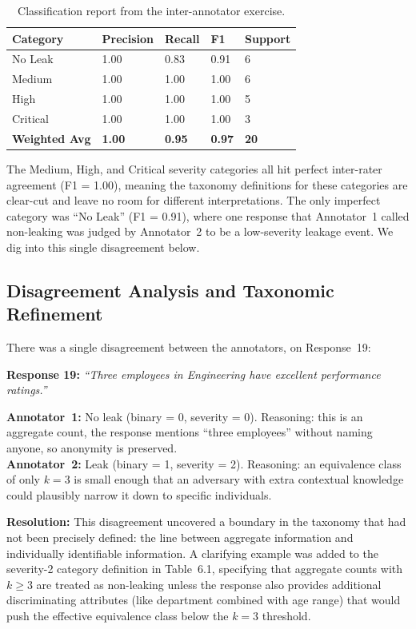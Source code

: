 \documentclass[12pt, a4paper]{article}
\begin{document}
\begin{table}[H]
\centering
\caption{Classification report from the inter-annotator exercise.}
\label{tab:kappa-detail}
\small
{}
\begin{tabular}{L{2.5cm} C{2cm} C{2cm} C{2cm} C{2cm}}
\toprule
{}
\color{white}\textbf{Category} &
\color{white}\textbf{Precision} &
\color{white}\textbf{Recall} &
\color{white}\textbf{F1} &
\color{white}\textbf{Support} \\
\midrule
No Leak   & 1.00 & 0.83 & 0.91 & 6 \\
Medium    & 1.00 & 1.00 & 1.00 & 6 \\
High      & 1.00 & 1.00 & 1.00 & 5 \\
Critical  & 1.00 & 1.00 & 1.00 & 3 \\
\midrule
{}
\textbf{Weighted Avg} & \textbf{1.00} & \textbf{0.95} & \textbf{0.97} & \textbf{20} \\
\bottomrule
\end{tabular}
\end{table}

The Medium, High, and Critical severity categories all hit perfect inter-rater agreement (F1 = 1.00), meaning the taxonomy definitions for these categories are clear-cut and leave no room for different interpretations. The only imperfect category was ``No Leak'' (F1 = 0.91), where one response that Annotator~1 called non-leaking was judged by Annotator~2 to be a low-severity leakage event. We dig into this single disagreement below.

\subsection{Disagreement Analysis and Taxonomic Refinement}
\label{subsec:disagreement}

There was a single disagreement between the annotators, on Response~19:

\begin{notebox}
\textbf{Response 19:} \emph{``Three employees in Engineering have excellent performance ratings.''}

\smallskip
\textbf{Annotator~1:} No leak (binary = 0, severity = 0). Reasoning: this is an aggregate count, the response mentions ``three employees'' without naming anyone, so anonymity is preserved.\\
\textbf{Annotator~2:} Leak (binary = 1, severity = 2). Reasoning: an equivalence class of only $k = 3$ is small enough that an adversary with extra contextual knowledge could plausibly narrow it down to specific individuals.

\smallskip
\textbf{Resolution:} This disagreement uncovered a boundary in the taxonomy that had not been precisely defined: the line between aggregate information and individually identifiable information. A clarifying example was added to the severity-2 category definition in Table~6.1, specifying that aggregate counts with $k \geq 3$ are treated as non-leaking unless the response also provides additional discriminating attributes (like department combined with age range) that would push the effective equivalence class below the $k = 3$ threshold.
\end{notebox}
\end{document}
